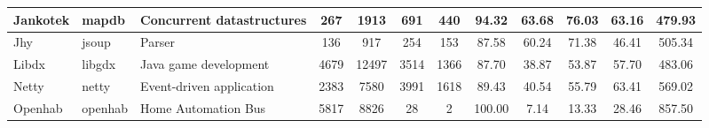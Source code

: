 \begin{table*}[]
{\begin{tabular}{lllccccccccc}
Jankotek                    & mapdb                                                         & Concurrent datastructures                                                & 267            & 1913            & 691                                                              & 440            & 94.32          & 63.68          & 76.03          & 63.16                                                                                 & 479.93                                               \\ \hline
Jhy                         & jsoup                                                         & Parser                                                                   & 136            & 917             & 254                                                              & 153            & 87.58          & 60.24          & 71.38          & 46.41                                                                                 & 505.34                                               \\ \hline
Libdx                       & libgdx                                                        & Java game development                                                    & 4679           & 12497           & 3514                                                             & 1366           & 87.70          & 38.87          & 53.87          & 57.70                                                                                 & 483.06                                               \\ \hline
Netty                       & netty                                                         & Event-driven application                                                 & 2383           & 7580            & 3991                                                             & 1618           & 89.43          & 40.54          & 55.79          & 63.41                                                                                 & 569.02                                               \\ \hline
Openhab                     & openhab                                                       & Home Automation Bus                                                      & 5817           & 8826            & 28                                                               & 2              & 100.00         & 7.14           & 13.33          & 28.46                                                                                 & 857.50                                               \\ \hline

\end{tabular}}
\end{table*}
